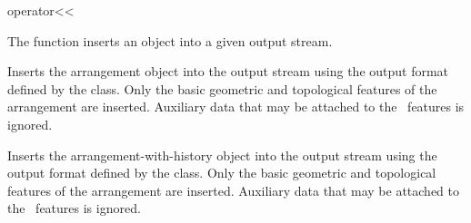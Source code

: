 \ccHtmlNoClassLinks
\begin{ccRefFunction}{operator<<}
\label{ref_arr_operator_leftshift}

\ccDefinition

The function \ccRefName{} inserts an object into a given output stream.



Inserts the arrangement object  into the output stream
 using the output format defined by the
 class. Only the basic geometric and
topological features of the arrangement are inserted. Auxiliary data
that may be attached to the \dcel\ features is ignored.



Inserts the arrangement-with-history object  into the output
stream  using the output format defined by the
 class. Only the basic geometric
and topological features of the arrangement are inserted. Auxiliary
data that may be attached to the \dcel\ features is ignored.






    

\end{ccRefFunction}
